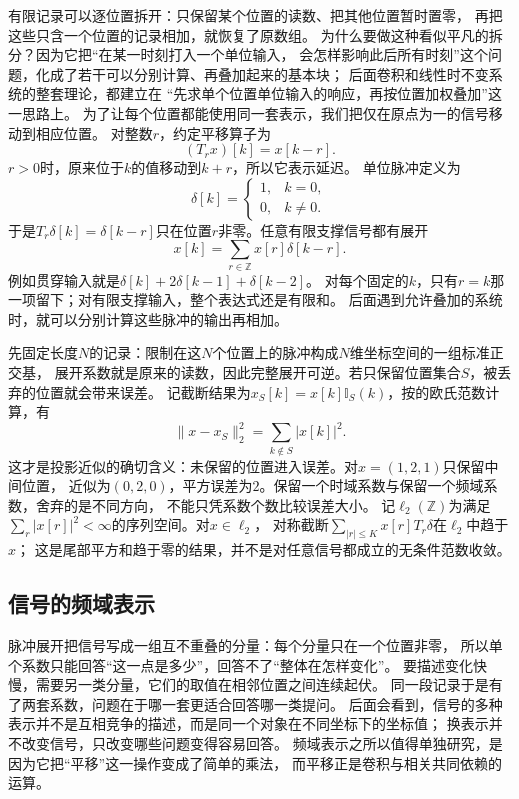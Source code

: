 有限记录可以逐位置拆开：只保留某个位置的读数、把其他位置暂时置零，
再把这些只含一个位置的记录相加，就恢复了原数组。
为什么要做这种看似平凡的拆分？因为它把“在某一时刻打入一个单位输入，
会怎样影响此后所有时刻”这个问题，化成了若干可以分别计算、再叠加起来的基本块；
后面卷积和线性时不变系统的整套理论，都建立在
“先求单个位置单位输入的响应，再按位置加权叠加”这一思路上。
为了让每个位置都能使用同一套表示，我们把仅在原点为一的信号移动到相应位置。
对整数$r$，约定平移算子为
\[
  (T_rx)[k]=x[k-r].
\]
$r>0$时，原来位于$k$的值移动到$k+r$，所以它表示延迟。
单位脉冲定义为
\[
  \delta[k]=
  \begin{cases}
    1,&k=0,\\
    0,&k\neq0.
  \end{cases}
\]
于是$T_r\delta[k]=\delta[k-r]$只在位置$r$非零。任意有限支撑信号都有展开
\begin{equation}
  x[k]=\sum_{r\in\mathbb Z}x[r]\delta[k-r].
  \label{eq:signal-analysis-impulse-expansion}
\end{equation}
例如贯穿输入就是$\delta[k]+2\delta[k-1]+\delta[k-2]$。
对每个固定的$k$，只有$r=k$那一项留下；对有限支撑输入，整个表达式还是有限和。
后面遇到允许叠加的系统时，就可以分别计算这些脉冲的输出再相加。

先固定长度$N$的记录：限制在这$N$个位置上的脉冲构成$N$维坐标空间的一组标准正交基，
展开系数就是原来的读数，因此完整展开可逆。若只保留位置集合$S$，被丢弃的位置就会带来误差。
记截断结果为$x_S[k]=x[k]\mathbb I_S(k)$，按的欧氏范数计算，有
\[
  \|x-x_S\|_2^2=\sum_{k\notin S}|x[k]|^2.
\]
这才是投影近似的确切含义：未保留的位置进入误差。对$x=(1,2,1)$只保留中间位置，
近似为$(0,2,0)$，平方误差为$2$。保留一个时域系数与保留一个频域系数，舍弃的是不同方向，
不能只凭系数个数比较误差大小。
记$\ell_2(\mathbb Z)$为满足$\sum_r|x[r]|^2<\infty$的序列空间。对$x\in\ell_2$，
对称截断$\sum_{|r|\leq K}x[r]T_r\delta$在$\ell_2$中趋于$x$；
这是尾部平方和趋于零的结果，并不是对任意信号都成立的无条件范数收敛。

\subsection{信号的频域表示}
\label{sec:signal-analysis-frequency-representation}

脉冲展开把信号写成一组互不重叠的分量：每个分量只在一个位置非零，
所以单个系数只能回答“这一点是多少”，回答不了“整体在怎样变化”。
要描述变化快慢，需要另一类分量，它们的取值在相邻位置之间连续起伏。
同一段记录于是有了两套系数，问题在于哪一套更适合回答哪一类提问。
后面会看到，信号的多种表示并不是互相竞争的描述，而是同一个对象在不同坐标下的坐标值；
换表示并不改变信号，只改变哪些问题变得容易回答。
频域表示之所以值得单独研究，是因为它把“平移”这一操作变成了简单的乘法，
而平移正是卷积与相关共同依赖的运算。

